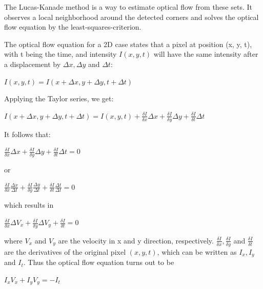 The Lucas-Kanade method \cite{lucas81, tomasi91} is a way to estimate optical flow from these sets. It observes a local neighborhood around the detected corners and solves the optical flow equation by the least-squares-criterion.

The optical flow equation for a 2D case states that a pixel at position (x, y, t), with t being the time, and intensity $I(x, y, t)$ will have the same intensity after a displacement by $\Delta x, \Delta y$ and $\Delta t$:

\begin{center}
\large
$I(x, y, t) = I(x + \Delta x, y + \Delta y, t + \Delta t)$
\normalsize
\end{center}

Applying the Taylor series, we get:

\begin{center}
\large
$I(x + \Delta x, y + \Delta y, t + \Delta t) = I(x, y, t) + \frac{\delta I}{\delta x}\Delta x + \frac{\delta I}{\delta y}\Delta y + \frac{\delta I}{\delta t}\Delta t$
\normalsize
\end{center}

It follows that: 

\begin{center}
\large
$\frac{\delta I}{\delta x}\Delta x + \frac{\delta I}{\delta y}\Delta y + \frac{\delta I}{\delta t}\Delta t = 0$
\normalsize
\end{center}

or

\begin{center}
\large
$\frac{\delta I}{\delta x}\frac{\Delta x}{\Delta t} + \frac{\delta I}{\delta y}\frac{\Delta y}{\Delta t} + \frac{\delta I}{\delta t}\frac{\Delta t}{\Delta t} = 0$
\normalsize
\end{center}

which results in 

\begin{center}
\large
$\frac{\delta I}{\delta x}\Delta V_x + \frac{\delta I}{\delta y}\Delta V_y + \frac{\delta I}{\delta t} = 0$
\normalsize
\end{center}

where $V_x$ and $V_y$ are the velocity in x and y direction, respectively. $\frac{\delta I}{\delta x}, \frac{\delta I}{\delta y}$ and $\frac{\delta I}{\delta t}$ are the derivatives of the original pixel $(x, y, t)$, which can be written as $I_x, I_y$ and $I_t$.
Thus the optical flow equation turns out to be

\begin{center}
\large
$I_x V_x + I_y V_y = -I_t$
\normalsize
\end{center}

